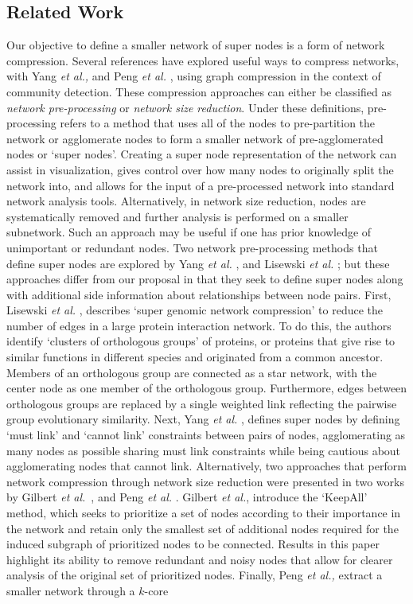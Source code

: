  \subsection{Related Work}
 Our objective to define a smaller network of super nodes is a form of network compression. Several references have explored useful ways to compress networks,\cite{supergenomic,SuperNodeSide,gilbert,peng} with Yang \emph{et al.,} \cite{SuperNodeSide} and Peng \emph{et al.} \cite{peng}, using graph compression in the context of community detection. These compression approaches can either be classified as \emph{network pre-processing} or \emph{network size reduction}. Under these definitions, pre-processing refers to a method that uses all of the nodes to pre-partition the network or agglomerate nodes to form a smaller network of pre-agglomerated nodes or `super nodes'. Creating a super node representation of the network can assist in visualization, gives control over how many nodes to originally split the network into, and allows for the input of a pre-processed network into standard network analysis tools.  Alternatively, in network size reduction, nodes are systematically removed and further analysis is performed on a smaller subnetwork. Such an approach may be useful if one has prior knowledge of unimportant or redundant nodes. Two network pre-processing methods that define super nodes are explored by Yang \emph{et al.} \cite{SuperNodeSide}, and Lisewski \emph{et al.} \cite{supergenomic}; but these approaches differ from our proposal in that they seek to define super nodes along with additional side information about relationships between node pairs. First, Lisewski \emph{et al.} \cite{supergenomic}, describes `super genomic network compression' to reduce the number of edges in a large protein interaction network. To do this, the authors identify `clusters of orthologous  groups' of proteins, or proteins that give rise to similar functions in different species and originated from a common ancestor. Members of an orthologous group are connected as a star network, with the center node as one member of the orthologous group. Furthermore, edges between orthologous groups are replaced by a single weighted link reflecting the pairwise group evolutionary similarity. Next, Yang \emph{et al.} \cite{SuperNodeSide}, defines super nodes by defining `must link' and `cannot link' constraints between pairs of nodes, agglomerating as many nodes as possible sharing must link constraints while being cautious about agglomerating nodes that cannot link. Alternatively, two approaches that perform network compression through network size reduction were presented in two works by Gilbert \emph{et al.}~\cite{gilbert}, and Peng \emph{et al.} \cite{peng}. Gilbert \emph{et al.}, introduce the `KeepAll' method, \cite{gilbert} which seeks to prioritize a set of nodes according to their importance in the network and retain only the smallest set of additional nodes required for the induced subgraph of prioritized nodes to be connected. Results in this paper highlight its ability to remove redundant and noisy nodes that allow for clearer analysis of the original set of prioritized nodes. Finally, Peng \emph{et al.,} \cite{peng} extract a smaller network through a $k$-core 